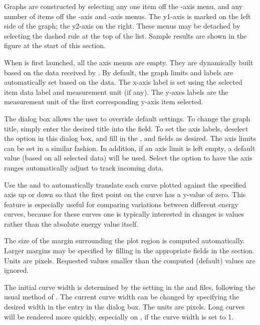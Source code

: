 Graphs are constructed by selecting any one item off the
-axis menu, and any number of items off the -axis and
-axis menus.  The y1-axis is marked on the left side of the
graph; the y2-axis on the right.  These menus may be detached by
selecting the dashed rule at the top of the list.  Sample results are
shown in the figure at the start of this section.

When  is first launched, all the axis menus are empty.
They are dynamically built based on the data received by .
By default, the graph limits and labels are automatically set based on
the data.  The x-axis label is set using the selected item data label
and measurement unit (if any).  The y-axes labels are the measurement
unit of the first corresponding y-axis item selected.

The  dialog box allows the user to
override default settings.  To change the graph title, simply enter
the desired title into the  field.  To set the axis labels,
deselect the  option in this dialog box, and fill in the
,  and  fields as desired.
The axis limits can be set in a similar fashion.  In addition, if an
axis limit is left empty, a default value (based on all selected data)
will be used.  Select the  option to have the axis
ranges automatically adjust to track incoming data.

Use the  and  to automatically
translate each curve plotted against the specified axis up or down so
that the first point on the curve has a y-value of zero.  This feature
is especially useful for comparing variations between different energy
curves, because for these curves one is typically interested in
changes is values rather than the absolute energy value itself.

The size of the margin surrounding the plot region is computed
automatically.  Larger margins may be specified by filling in the
appropriate fields in the  section.  Units are
pixels.  Requested values smaller than the computed (default) values are
ignored.

The initial curve width is determined by the  setting in the  and
 files, following the usual method of
.  The current curve
width can be changed by specifying the desired width in the  entry in the {} dialog box.
The units are pixels.  Long curves will be rendered more quickly,
especially on \Windows, if the curve width is set to 1.


